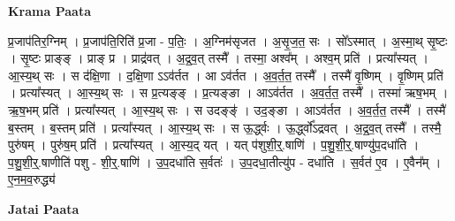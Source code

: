 \documentclass[17pt]{extarticle}
\begin{document}
\textbf{Krama Paata} \newline

प्र॒जाप॑तिर॒ग्निम् । प्र॒जाप॑ति॒रिति॑ प्र॒जा - प॒तिः॒ । अ॒ग्निम॑सृजत । अ॒सृ॒ज॒त॒ सः । सो᳚ऽस्मात् । अ॒स्मा॒थ् सृ॒ष्टः । सृ॒ष्टः प्राङ्ङ् । प्राङ् प्र । प्राद्र॑वत् । अ॒द्र॒व॒त् तस्मै᳚ । तस्मा॒ अश्व᳚म् । अश्व॒म् प्रति॑ । प्रत्या᳚स्यत् । आ॒स्य॒थ् सः । स द॑क्षि॒णा । द॒क्षि॒णा ऽऽव॑र्तत । आ ऽव॑र्तत । अ॒व॒र्त॒त॒ तस्मै᳚ । तस्मै॑ वृ॒ष्णिम् । वृ॒ष्णिम् प्रति॑ । प्रत्या᳚स्यत् । आ॒स्य॒थ् सः । स प्र॒त्यङ्ङ् । प्र॒त्यङ्ङा । आऽव॑र्तत । अ॒व॒र्त॒त॒ तस्मै᳚ । तस्मा॑ ऋष॒भम् । ऋ॒ष॒भम् प्रति॑ । 
प्रत्या᳚स्यत् । आ॒स्य॒थ् सः । स उदङ्ङ्॑ । उद॒ङ्ङा । आऽव॑र्तत । अ॒व॒र्त॒त॒ तस्मै᳚ । तस्मै॑ ब॒स्तम् । ब॒स्तम् प्रति॑ । प्रत्या᳚स्यत् । आ॒स्य॒थ् सः । स ऊ॒र्द्ध्वः । ऊ॒र्द्ध्वो᳚ऽद्रवत् । अ॒द्र॒व॒त् तस्मै᳚ । तस्मै॒ पुरु॑षम् । पुरु॑ष॒म् प्रति॑ । प्रत्या᳚स्यत् । आ॒स्य॒द् यत् । यत् प॑शुशी॒र्॒.षाणि॑ । प॒शु॒शी॒र्॒.षाण्यु॑प॒दधा॑ति । प॒शु॒शी॒र्॒.षाणीति॑ पशु - शी॒र्॒.षाणि॑ । उ॒प॒दधा॑ति स॒र्वतः॑ । उ॒प॒दधा॒तीत्यु॑प - दधा॑ति । स॒र्वत॑ ए॒व । ए॒वैन᳚म् । ए॒न॒म॒व॒रुद्ध्य॑ \newline

\textbf{Jatai Paata} \newline
\end{document}
